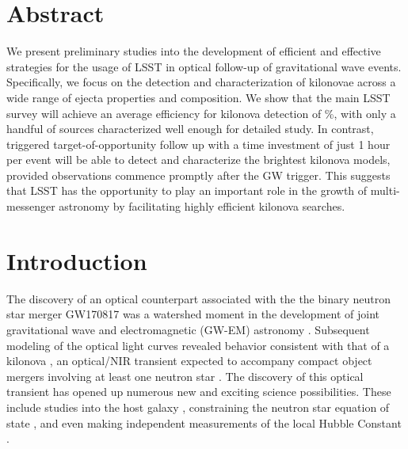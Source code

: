 \section*{Abstract}
We present preliminary studies into the development of efficient and effective strategies for the usage of LSST in optical follow-up of gravitational wave events. Specifically, we focus on the detection and characterization of kilonovae across a wide range of ejecta properties and composition. We show that the main LSST survey will achieve an average efficiency for kilonova detection of \%, with only a handful of sources characterized well enough for detailed study. In contrast, triggered target-of-opportunity follow up with a time investment of just 1 hour per event will be able to detect and characterize the brightest kilonova models, provided observations commence promptly after the GW trigger. This suggests that LSST has the opportunity to play an important role in the growth of multi-messenger astronomy by facilitating highly efficient kilonova searches.

\clearpage
\section{Introduction}
\label{sec:ch6_intro}
The discovery of an optical counterpart associated with the the binary neutron star merger GW170817 was a watershed moment in the development of joint gravitational wave and electromagnetic (GW-EM) astronomy \citep{LIGOGW170817,LIGOMMAPaper,Arcavi+17,Coulter+17,GW170817DECam,Valenti+17}. Subsequent modeling of the optical light curves revealed behavior consistent with that of a kilonova \citep{Cowp+17,Kilpatrick+17,Tanaka+17,Villar+17b, Tanaka+18}, an optical/NIR transient expected to accompany compact object mergers involving at least one neutron star \citep[see e.g.,][]{Metzger2017}. The discovery of this optical transient has opened up numerous new and exciting science possibilities. These include studies into the host galaxy \citep[NGC4993, see e.g.,][]{Blanchard+17,Cantiello+18}, constraining the neutron star equation of state \citep[see e.g.,][]{Radice+18}, and even making independent measurements of the local Hubble Constant \citep[H$_0$, see e.g.,][]{LIGOH0,Guidorzi+17}.

